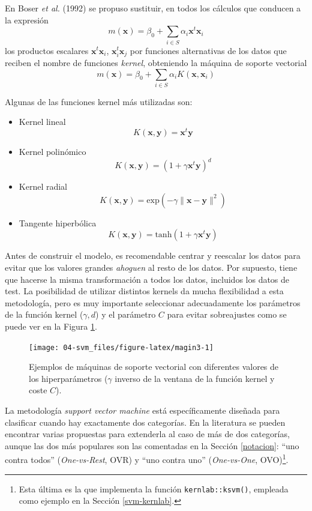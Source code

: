 \documentclass[
]{book}
\theoremstyle{break}
\theoremstyle{nonumberplain}
\begin{document}
En Boser \emph{et al.} (1992) se propuso sustituir, en todos los cálculos que conducen a la expresión
\[m(\mathbf{x}) = \beta_0 + \sum_{i\in S} \alpha_i \mathbf{x}^t \mathbf{x}_i\]
los productos escalares \(\mathbf{x}^t \mathbf{x}_i\), \(\mathbf{x}_i^t \mathbf{x}_j\) por funciones alternativas de los datos que reciben el nombre de funciones \emph{kernel}, obteniendo la máquina de soporte vectorial
\[m(\mathbf{x}) = \beta_0 + \sum_{i\in S} \alpha_i K(\mathbf{x}, \mathbf{x}_i)\]

Algunas de las funciones kernel más utilizadas son:

\begin{itemize}
\item
  Kernel lineal
  \[K(\mathbf{x}, \mathbf{y}) = \mathbf{x}^t \mathbf{y}\]
\item
  Kernel polinómico
  \[K(\mathbf{x}, \mathbf{y}) = (1 + \gamma \mathbf{x}^t \mathbf{y})^d\]
\item
  Kernel radial
  \[K(\mathbf{x}, \mathbf{y}) = \mbox{exp} (-\gamma \| \mathbf{x} - \mathbf{y} \|^2)\]
\item
  Tangente hiperbólica
  \[K(\mathbf{x}, \mathbf{y}) = \mbox{tanh} (1 + \gamma \mathbf{x}^t \mathbf{y})\]
\end{itemize}



Antes de construir el modelo, es recomendable centrar y reescalar los datos para evitar que los valores grandes \emph{ahoguen} al resto de los datos. Por supuesto, tiene que hacerse la misma transformación a todos los datos, incluidos los datos de test. La posibilidad de utilizar distintos kernels da mucha flexibilidad a esta metodología, pero es muy importante seleccionar adecuadamente los parámetros de la función kernel (\(\gamma,d\)) y el parámetro \(C\) para evitar sobreajustes como se puede ver en la Figura \ref{fig:magin3}.

\begin{figure}[!htb]

{\centering \texttt{[image: 04-svm\_files/figure-latex/magin3-1]} 

}

\caption{Ejemplos de máquinas de soporte vectorial con diferentes valores de los hiperparámetros (\(\gamma\) inverso de la ventana de la función kernel y coste \(C\)).}\label{fig:magin3}
\end{figure}

La metodología \emph{support vector machine} está específicamente diseñada para clasificar cuando hay exactamente dos categorías.
En la literatura se pueden encontrar varias propuestas para extenderla al caso de más de dos categorías, aunque las dos más populares son las comentadas en la Sección \ref{notacion}: ``uno contra todos'' (\emph{One-vs-Rest}, OVR) y ``uno contra uno'' (\emph{One-vs-One}, OVO)\footnote{Esta última es la que implementa la función \texttt{kernlab::ksvm()}, empleada como ejemplo en la Sección \ref{svm-kernlab}.}.
\end{document}
